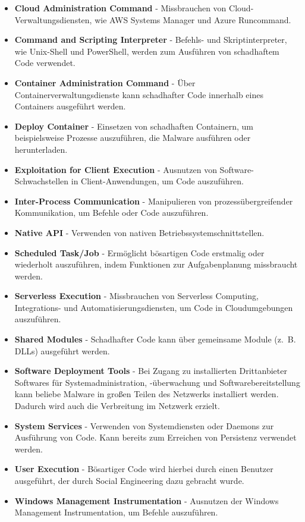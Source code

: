 \documentclass[conference]{IEEEtran}
\begin{document}
\begin{itemize}
    \item \textbf{Cloud Administration Command} - Missbrauchen von Cloud-Verwaltungsdiensten, wie AWS Systems Manager und Azure Runcommand.
    \item \textbf{Command and Scripting Interpreter} - Befehls- und Skriptinterpreter, wie Unix-Shell und PowerShell, werden zum Ausführen von schadhaftem Code verwendet.
    \item \textbf{Container Administration Command} - Über Containerverwaltungsdienste kann schadhafter Code innerhalb eines Containers ausgeführt werden.
    \item \textbf{Deploy Container} - Einsetzen von schadhaften Containern, um beispielsweise Prozesse auszuführen, die Malware ausführen oder herunterladen.
    \item \textbf{Exploitation for Client Execution} - Ausnutzen von Software-Schwachstellen in Client-Anwendungen, um Code auszuführen.
    \item \textbf{Inter-Process Communication} - Manipulieren von prozessübergreifender Kommunikation, um Befehle oder Code auszuführen.
    \item \textbf{Native API} - Verwenden von nativen Betriebssystemschnittstellen.
    \item \textbf{Scheduled Task/Job} - Ermöglicht bösartigen Code erstmalig oder wiederholt auszuführen, indem Funktionen zur Aufgabenplanung missbraucht werden.
    \item \textbf{Serverless Execution} - Missbrauchen von Serverless Computing, Integrations- und Automatisierungsdiensten, um Code in Cloudumgebungen auszuführen.
    \item \textbf{Shared Modules} - Schadhafter Code kann über gemeinsame Module (z.~B. DLLs) ausgeführt werden.
    \item \textbf{Software Deployment Tools} - Bei Zugang zu installierten Drittanbieter Softwares für Systemadministration, -überwachung und Softwarebereitstellung kann beliebe Malware in großen Teilen des Netzwerks installiert werden. Dadurch wird auch die Verbreitung im Netzwerk erzielt.
    \item \textbf{System Services} - Verwenden von Systemdiensten oder Daemons zur Ausführung von Code. Kann bereits zum Erreichen von Persistenz verwendet werden.
    \item \textbf{User Execution} - Bösartiger Code wird hierbei durch einen Benutzer ausgeführt, der durch Social Engineering dazu gebracht wurde.
    \item \textbf{Windows Management Instrumentation} - Ausnutzen der Windows Management Instrumentation, um Befehle auszuführen.
\end{itemize}
\end{document}
